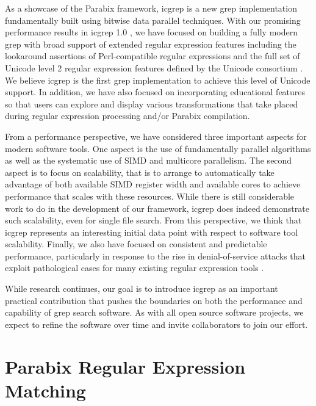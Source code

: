 \documentclass{article}
\begin{document}
As a showcase of the Parabix framework, icgrep is a new grep
implementation fundamentally built using bitwise data parallel
techniques.   With our promising performance results in icgrep 1.0 \cite{cameron2014bitwise},
we have focused on building a fully modern grep with broad
support of extended regular expression features including 
the lookaround assertions of Perl-compatible regular expressions
and the full set of Unicode level 2 regular expression features
defined by the Unicode consortium \cite{davis2016unicode}.   We believe icgrep is the first
grep implementation to achieve this level of Unicode support.
In addition, we have also focused on incorporating educational
features so that users can explore and display various transformations
that take placed during regular expression processing and/or 
Parabix compilation.

From a performance perspective, we have considered three important
aspects for modern software tools.    One aspect is the
use of fundamentally parallel algorithms as well as the systematic
use of SIMD and multicore parallelism.   The second aspect is to
focus on scalability, that is to arrange to automatically take
advantage of both available SIMD register width and available
cores to achieve performance that scales with these resources.
While there is still considerable work to do in the development of 
our framework, icgrep does indeed demonstrate such scalability, 
even for single file search.
From this perspective, we think that icgrep represents an interesting
initial data point with respect to software tool scalability.
Finally, we also have focused on consistent and predictable performance,
particularly in response to the rise in denial-of-service attacks
that exploit pathological cases for many existing regular expression
tools \cite{kirrage2013static}.

While research continues, our goal is to introduce icgrep as
an important practical contribution that pushes the boundaries
on both the performance and capability of grep search software.
As with all open source software projects, we expect to refine
the software over time and invite collaborators to join our
effort.

\section{Parabix Regular Expression Matching}


\printbibliography
\end{document}
